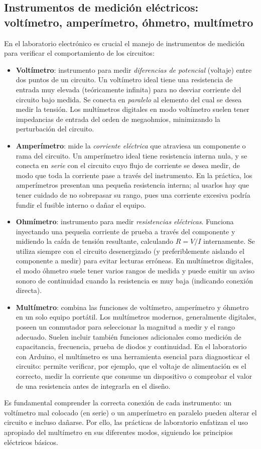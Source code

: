 \documentclass{article}
\begin{document}
\subsection{Instrumentos de medición eléctricos: voltímetro, amperímetro, óhmetro, multímetro}
En el laboratorio electrónico es crucial el manejo de instrumentos de medición para verificar el comportamiento de los circuitos:
\begin{itemize}
  \item \textbf{Voltímetro}: instrumento para medir \textit{diferencias de potencial} (voltaje) entre dos puntos de un circuito.\cite{Bell2013} Un voltímetro ideal tiene una resistencia de entrada muy elevada (teóricamente infinita) para no desviar corriente del circuito bajo medida. Se conecta en \textit{paralelo} al elemento del cual se desea medir la tensión. Los multímetros digitales en modo voltímetro suelen tener impedancias de entrada del orden de megaohmios, minimizando la perturbación del circuito.\cite{Bell2013}
  \item \textbf{Amperímetro}: mide la \textit{corriente eléctrica} que atraviesa un componente o rama del circuito.\cite{Bell2013} Un amperímetro ideal tiene resistencia interna nula, y se conecta en \textit{serie} con el circuito cuyo flujo de corriente se desea medir, de modo que toda la corriente pase a través del instrumento. En la práctica, los amperímetros presentan una pequeña resistencia interna; al usarlos hay que tener cuidado de no sobrepasar su rango, pues una corriente excesiva podría fundir el fusible interno o dañar el equipo.
  \item \textbf{Ohmímetro}: instrumento para medir \textit{resistencias eléctricas}. Funciona inyectando una pequeña corriente de prueba a través del componente y midiendo la caída de tensión resultante, calculando $R = V/I$ internamente.\cite{Bell2013} Se utiliza siempre con el circuito desenergizado (y preferiblemente aislando el componente a medir) para evitar lecturas erróneas. En multímetros digitales, el modo óhmetro suele tener varios rangos de medida y puede emitir un aviso sonoro de continuidad cuando la resistencia es muy baja (indicando conexión directa).
  \item \textbf{Multímetro}: combina las funciones de voltímetro, amperímetro y óhmetro en un solo equipo portátil.\cite{Bell2013} Los multímetros modernos, generalmente digitales, poseen un conmutador para seleccionar la magnitud a medir y el rango adecuado. Suelen incluir también funciones adicionales como medición de capacitancia, frecuencia, prueba de diodos y continuidad. En el laboratorio con Arduino, el multímetro es una herramienta esencial para diagnosticar el circuito: permite verificar, por ejemplo, que el voltaje de alimentación es el correcto, medir la corriente que consume un dispositivo o comprobar el valor de una resistencia antes de integrarla en el diseño.
\end{itemize}
Es fundamental comprender la correcta conexión de cada instrumento: un voltímetro mal colocado (en serie) o un amperímetro en paralelo pueden alterar el circuito e incluso dañarse. Por ello, las prácticas de laboratorio enfatizan el uso apropiado del multímetro en sus diferentes modos, siguiendo los principios eléctricos básicos.\cite{Bell2013}
\end{document}

